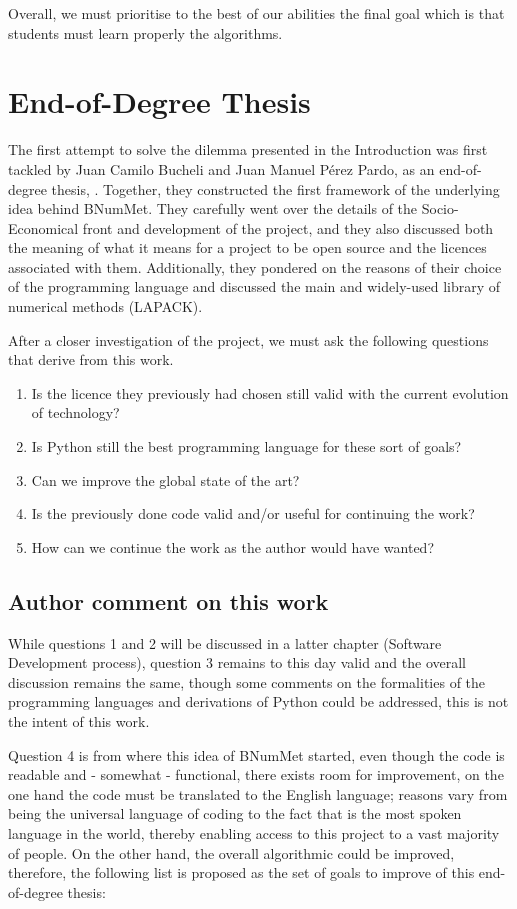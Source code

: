 Overall, we must prioritise to the best of our abilities the final goal which is that students must learn properly the algorithms. 

\section{End-of-Degree Thesis}
The first attempt to solve the dilemma presented in the Introduction was first tackled by Juan Camilo Bucheli and Juan Manuel Pérez Pardo, as an end-of-degree thesis, \cite{}. Together, they constructed the first framework of the underlying idea behind BNumMet.
They carefully went over the details of the Socio-Economical front and development of the project, and they also discussed both the meaning of what it means for a project to be open source and the licences associated with them. Additionally, they pondered on the reasons of their choice of the programming language and discussed the main and widely-used library of numerical methods (LAPACK). 


After a closer investigation of the project, we must ask the following questions that derive from this work.
\begin{enumerate}
    \item Is the licence they previously had chosen still valid with the current evolution of technology?
    \item Is Python still the best programming language for these sort of goals?
    \item Can we improve the global state of the art?
    \item Is the previously done code valid and/or useful for continuing the work?
    \item How can we continue the work as the author would have wanted?
\end{enumerate}


\subsection{Author comment on this work}
While questions 1 and 2 will be discussed in a latter chapter (Software Development process), question 3 remains to this day valid and the overall discussion remains the same, though some comments on the formalities of the programming languages and derivations of Python could be addressed, this is not the intent of this work.

Question 4 is from where this idea of BNumMet started, even though the code is readable and - somewhat - functional, there exists room for improvement, on the one hand the code must be translated to the English language; reasons vary from being the universal language of coding to the fact that is the most spoken language in the world, thereby enabling access to this project to a vast majority of people. On the other hand, the overall algorithmic could be improved, therefore, the following list is proposed as the set of goals to improve of this end-of-degree thesis:

